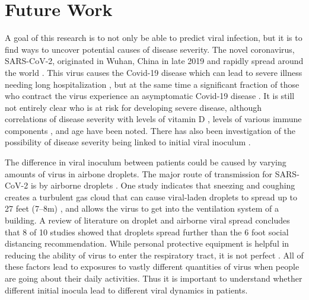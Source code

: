 \section{Future Work}

A goal of this research is to not only be able to predict viral infection, but it is to find ways to uncover potential causes of disease severity. The novel coronavirus, SARS-CoV-2, originated in Wuhan, China in late 2019 and rapidly spread around the world \citep{chen20,wu20}. This virus causes the Covid-19 disease which can lead to severe illness needing long hospitalization \citep{sun20,goyal20,jiang20}, but at the same time a significant fraction of those who contract the virus experience an asymptomatic Covid-19 disease \citep{he20}. It is still not entirely clear who is at risk for developing severe disease, although correlations of disease severity with levels of vitamin D \citep{ilie20}, levels of various immune components \citep{liu20imm,liu20imm2,zhang20imm,yang20imm}, and age \citep{borghesi20,zhang20imm} have been noted. There has also been investigation of the possibility of disease severity being linked to initial viral inoculum \citep{little20, guallar20, ghandi20}.

The difference in viral inoculum between patients could be caused by varying amounts of virus in airbone droplets. The major route of transmission for SARS-CoV-2 is by airborne droplets \citep{morawska20}. One study indicates that sneezing and coughing creates a turbulent gas cloud that can cause viral-laden droplets to spread up to 27 feet (\numrange[range-phrase = --]{7}{8}\si{\meter}) \citep{bourouiba20}, and allows the virus to get into the ventilation system of a building. A review of literature on droplet and airborne viral spread concludes that 8 of 10 studies showed that droplets spread further than the 6 foot \citep{bahl20} social distancing recommendation. While personal protective equipment is helpful in reducing the ability of virus to enter the respiratory tract, it is not perfect \citep{mittal20}. All of these factors lead to exposures to vastly different quantities of virus when people are going about their daily activities. Thus it is important to understand whether different initial inocula lead to different viral dynamics in patients. 

